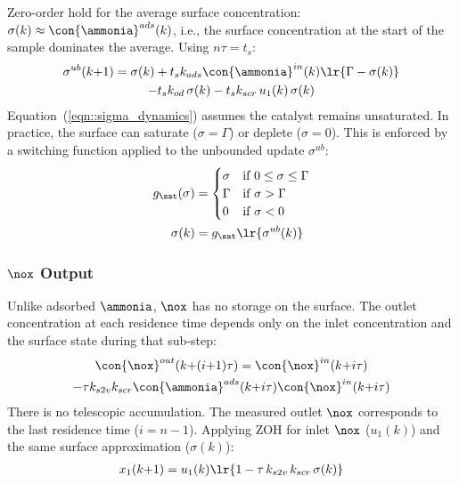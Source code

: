  Zero-order hold for the average surface concentration: $\sigma(k) \approx \con{\ammonia}^{ads}(k)$,
i.e., the surface concentration at the start of the sample dominates the average. Using $n\tau = t_s$:
\begin{multline}
    \sigma^{ub}(k{+}1) = \sigma(k) + t_s k_{ads}\con{\ammonia}^{in}(k)\lr{\Gamma - \sigma(k)} \\
        - t_s k_{od}\,\sigma(k) - t_s k_{scr}\,u_1(k)\,\sigma(k)
    \label{eqn::sigma_dynamics}
\end{multline}
Equation~(\ref{eqn::sigma_dynamics}) assumes the catalyst remains unsaturated. In practice, the surface can saturate
($\sigma = \Gamma$) or deplete ($\sigma = 0$). This is enforced by a switching function applied to the unbounded update
$\sigma^{ub}$:
\begin{align}
    g_{\sat}(\sigma) &= \begin{cases}
        \sigma  & \text{if } 0 \leq \sigma \leq \Gamma \\
        \Gamma  & \text{if } \sigma > \Gamma \\
        0       & \text{if } \sigma < 0
    \end{cases}
    \label{eqn::g_sat} \\
    \sigma(k) &= g_{\sat}\lr{\sigma^{ub}(k)}
    \label{eqn::sigma_switched}
\end{align}

\subsubsection{$\nox$ Output}

Unlike adsorbed $\ammonia$, $\nox$ has no storage on the surface. The outlet concentration at each residence time
depends only on the inlet concentration and the surface state during that sub-step:
\begin{multline}
    \con{\nox}^{out}(k{+}(i{+}1)\tau) = \con{\nox}^{in}(k{+}i\tau) \\
        - \tau k_{s2v} k_{scr}\con{\ammonia}^{ads}(k{+}i\tau)\con{\nox}^{in}(k{+}i\tau)
\end{multline}
There is no telescopic accumulation. The measured outlet $\nox$ corresponds to the last residence time ($i = n{-}1$).
Applying ZOH for inlet $\nox$ ($u_1(k)$) and the same surface approximation ($\sigma(k)$):
\begin{align}
    x_1(k{+}1) = u_1(k)\lr{1 - \tau\,k_{s2v}\,k_{scr}\,\sigma(k)}
    \label{eqn::nox_output}
\end{align}

